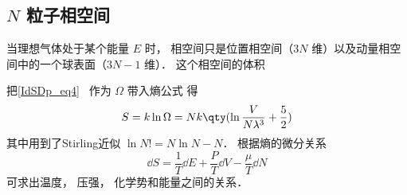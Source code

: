 
\begin{issues}
\issueDraft
\end{issues}

\subsection{$N$ 粒子相空间}

当理想气体处于某个能量 $E$ 时， 相空间只是位置相空间（$3N$ 维）以及动量相空间中的一个球表面（$3N-1$ 维）． 这个相空间的体积

把\autoref{IdSDp_eq4}~ 作为 $\Omega$ 带入熵公式%
得
\begin{equation}
S = k\ln \Omega  = Nk \qty(\ln \frac{V}{N\lambda^3} + \frac52)
\end{equation}
其中用到了Stirling近似%
$\ln N! = N\ln N - N$． 根据熵的微分关系
\begin{equation}
\dd{S} = \frac{1}{T} \dd{E} + \frac{P}{T} \dd{V} - \frac{\mu}{T} \dd{N}
\end{equation}
可求出温度， 压强， 化学势和能量之间的关系．
